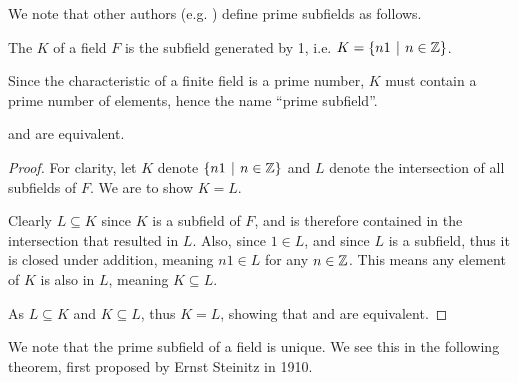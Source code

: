 We note that other authors (e.g. \cite[p.~511]{dummit_foote_2004}) define prime subfields as follows.

\begin{definition}\label{definition-prime-subfield-alt}
    The  $K$ of a field $F$ is the subfield generated by 1, i.e. $K = \{n1 \vert n \in \Z\}$.
\end{definition}
\begin{remark}
    Since the characteristic of a finite field is a prime number, $K$ must contain a prime number of elements, hence the name ``prime subfield''.
\end{remark}
\begin{theorem}
     and  are equivalent.
\end{theorem}
\begin{proof}
    For clarity, let $K$ denote $\{n1 \vert n \in \Z\}$ and $L$ denote the intersection of all subfields of $F$. We are to show $K = L$.

    Clearly $L \subseteq K$ since $K$ is a subfield of $F$, and is therefore contained in the intersection that resulted in $L$. Also, since $1 \in L$, and since $L$ is a subfield, thus it is closed under addition, meaning $n1 \in L$ for any $n \in \mathbb{Z}$. This means any element of $K$ is also in $L$, meaning $K \subseteq L$.

    As $L \subseteq K$ and $K \subseteq L$, thus $K = L$, showing that  and  are equivalent.
\end{proof}

We note that the prime subfield of a field is unique. We see this in the following theorem, first proposed by Ernst Steinitz in 1910.

\newpage

